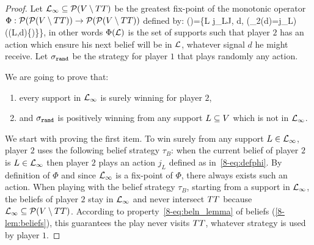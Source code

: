 \begin{proof}


Let $\mathcal{L}_\infty\subseteq \mathcal{P}(V\setminus TT)$
be the greatest fix-point of the monotonic operator
$\Phi:\mathcal{P}(\mathcal{P}(V\setminus TT))\to \mathcal{P}(\mathcal{P}(V\setminus TT))$ defined by:
\be
\label{eq:defphi}
\Phi(\LL)=\{L\in \LL \mid
\exists j_L\in J, \forall d\in\signauxdeux, (\action_2(d)=j_L)\implies (\beldeux(L,d)\in \LL \cup \{\emptyset)\}\}\enspace,
\ee
in other words $\Phi(\mathcal{L})$ is the set of supports
such that player $2$ has an action which
ensure his next belief will be in $\mathcal{L}$,
whatever signal $d$ he might receive.
Let $\sigma_{{\tt rand}}$ be the strategy for player $1$ that plays randomly any action.

We are going to prove that:
\begin{enumerate}
\item every support in $\mathcal{L}_\infty$ is surely winning for player $2$,
\item and $\sigma_{{\tt rand}}$ is positively winning from any support $L\subseteq V$ which is not in $\mathcal{L}_\infty$.
\end{enumerate}

We start with proving the first item.
To win surely from any support $L\in\mathcal{L}_\infty$, player $2$ uses the following
belief strategy $\tau_B$: when the current belief of player $2$ is $L\in\mathcal{L}_\infty$ then player $2$
plays an action $j_L$ defined as in~\cref{8-eq:defphi}.
By definition of $\Phi$ and since $\mathcal{L}_\infty$ is a fix-point of $\Phi$,
there always exists such an action.
When playing with the belief strategy $\tau_B$,
starting from a support in $\mathcal{L}_\infty$,
the beliefs of player $2$ stay in $\mathcal{L}_\infty$
and never intersect $TT$ because $\mathcal{L}_\infty\subseteq \mathcal{P}(V\setminus TT)$.
{According to property~\cref{8-eq:beln_lemma} of beliefs (\cref{8-lem:beliefs})},
this guarantees the play never visits $TT$,
whatever strategy is used by player $1$.


\end{proof}
